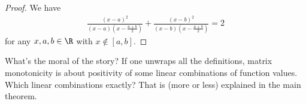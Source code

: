 \begin{proof}
	We have
	\begin{align*}
		\frac{(x - a)^2}{(x - a) (x - \frac{a + b}{2})} + \frac{(x - b)^2}{(x - b) (x - \frac{a + b}{2})} = 2
	\end{align*}
	for any $x, a, b \in \R$ with $x \notin [a, b]$.
\end{proof}

What's the moral of the story? If one unwraps all the definitions, matrix monotonicity is about positivity of some linear combinations of function values. Which linear combinations exactly? That is (more or less) explained in the main theorem.
